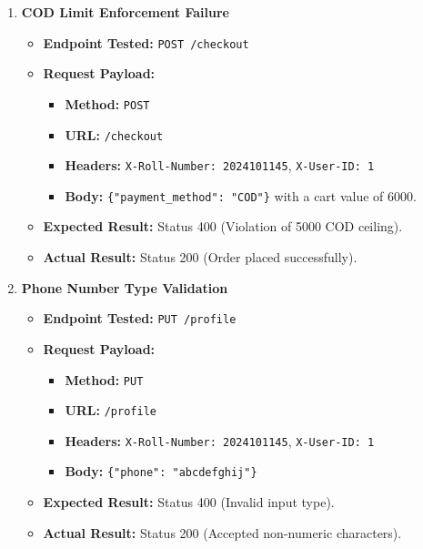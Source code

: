 \documentclass{article}
\begin{document}
\begin{enumerate}
    \item \textbf{COD Limit Enforcement Failure}
    \begin{itemize}
        \item \textbf{Endpoint Tested:} \texttt{POST /checkout}
        \item \textbf{Request Payload:} 
        \begin{itemize}
            \item \textbf{Method:} \texttt{POST}
            \item \textbf{URL:} \texttt{/checkout}
            \item \textbf{Headers:} \texttt{X-Roll-Number: 2024101145}, \texttt{X-User-ID: 1}
            \item \textbf{Body:} \texttt{\{"payment_method": "COD"\}} with a cart value of 6000.
        \end{itemize}
        \item \textbf{Expected Result:} Status 400 (Violation of 5000 COD ceiling).
        \item \textbf{Actual Result:} Status 200 (Order placed successfully).
    \end{itemize}

    \item \textbf{Phone Number Type Validation}
    \begin{itemize}
        \item \textbf{Endpoint Tested:} \texttt{PUT /profile}
        \item \textbf{Request Payload:} 
        \begin{itemize}
            \item \textbf{Method:} \texttt{PUT}
            \item \textbf{URL:} \texttt{/profile}
            \item \textbf{Headers:} \texttt{X-Roll-Number: 2024101145}, \texttt{X-User-ID: 1}
            \item \textbf{Body:} \texttt{\{"phone": "abcdefghij"\}}
        \end{itemize}
        \item \textbf{Expected Result:} Status 400 (Invalid input type).
        \item \textbf{Actual Result:} Status 200 (Accepted non-numeric characters).
    \end{itemize}


\end{enumerate}
\end{document}
